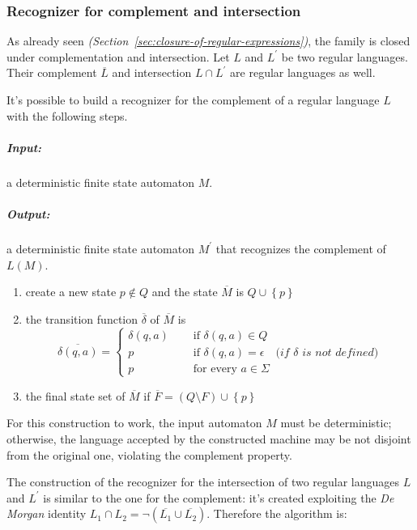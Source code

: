 \documentclass[english]{article}
\begin{document}
\subsubsection{Recognizer for complement and intersection}

As already seen \textit{(Section~\ref{sec:closure-of-regular-expressions})}, the \REG family is closed under complementation and intersection.
Let \(L\) and \(L^\prime\) be two regular languages. Their complement \(\overline{L}\) and intersection \(L \cap L^\prime\) are regular languages as well.

It's possible to build a recognizer for the complement of a regular language \(L\) with the following steps.

\bigskip
\subparagraph*{Input:}
a deterministic finite state automaton \(M\).

\subparagraph*{Output:}
a deterministic finite state automaton \(M^\prime\) that recognizes the complement of \(L(M)\).

\begin{enumerate}
  \item create a new state \(p \notin Q\) and the state \(\overline{M}\) is \(Q \cup \left\{ p \right\}\)
  \item the transition function \(\overline{\delta}\) of \(\overline{M}\) is
        \[\overline{\delta(q, a)} = \begin{cases}
            \delta(q, a) \quad & \text{ if } \delta(q, a)\in Q                                                             \\
            p \quad            & \text{ if } \delta(q, a) = \epsilon \quad \textit{(if }  \delta \textit{ is not defined)} \\
            p \quad            & \text{ for every } a \in \Sigma
          \end{cases}\]
  \item the final state set of \(\overline{M}\) if \(\overline{F} = \left( Q \setminus F \right) \cup \left\{ p \right\}\)
\end{enumerate}

For this construction to work, the input automaton \(M\) must be deterministic;
otherwise, the language accepted by the constructed machine may be not disjoint from the original one, violating the complement property.

\bigskip
The construction of the recognizer for the intersection of two regular languages \(L\) and \(L^\prime\) is similar to the one for the complement:
it's created exploiting the \textit{De Morgan} identity \(L_1 \cap L_2 = \lnot (\overline{L_1} \cup \overline{L_2})\).
Therefore the algorithm is:
\end{document}

